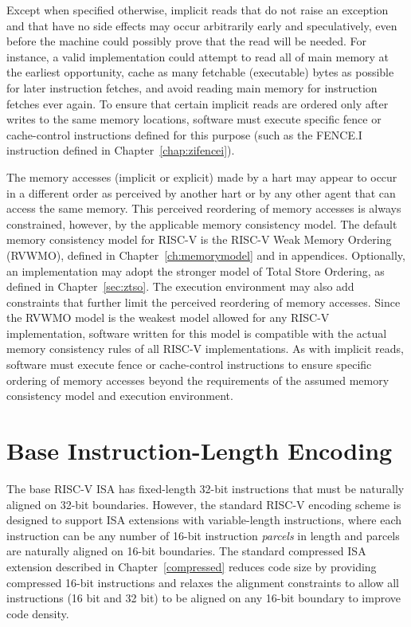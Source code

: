 Except when specified otherwise, implicit reads that do not raise an
exception and that have no side effects
may occur arbitrarily early and speculatively, even before the machine could
possibly prove that the read will be needed.  For instance, a valid
implementation could attempt to read all of main memory at the earliest
opportunity, cache as many fetchable (executable) bytes as possible for later
instruction fetches, and avoid reading main memory for instruction fetches ever
again.  To ensure that certain implicit reads are ordered only after writes to
the same memory locations, software must execute specific fence or cache-control
instructions defined for this purpose (such as the FENCE.I instruction
defined in Chapter~\ref{chap:zifencei}).

The memory accesses (implicit or explicit) made by a hart may appear to occur
in a different order as perceived by another hart or by any other agent that
can access the same memory.  This perceived reordering of memory accesses is
always constrained, however, by the applicable memory consistency model.  The
default memory consistency model for RISC-V is the RISC-V Weak Memory Ordering
(RVWMO), defined in Chapter~\ref{ch:memorymodel} and in appendices.
Optionally, an implementation may adopt the stronger model of Total Store
Ordering, as defined in Chapter~\ref{sec:ztso}.  The execution environment may
also add constraints that further limit the perceived reordering of memory
accesses.
Since the RVWMO model is the weakest model allowed for any RISC-V
implementation, software written for this model is compatible with the
actual memory consistency rules of all RISC-V implementations.  As with
implicit reads, software must execute fence or cache-control instructions to
ensure specific ordering of memory accesses beyond the requirements of the
assumed memory consistency model and execution environment.

\section{Base Instruction-Length Encoding}

The base RISC-V ISA has fixed-length 32-bit instructions that must be
naturally aligned on 32-bit boundaries.  However, the standard RISC-V
encoding scheme is designed to support ISA extensions with
variable-length instructions, where each instruction can be any number
of 16-bit instruction {\em parcels} in length and parcels are
naturally aligned on 16-bit boundaries.  The standard compressed ISA
extension described in Chapter~\ref{compressed} reduces code size by
providing compressed 16-bit instructions and relaxes the alignment
constraints to allow all instructions (16 bit and 32 bit) to be
aligned on any 16-bit boundary to improve code density.

